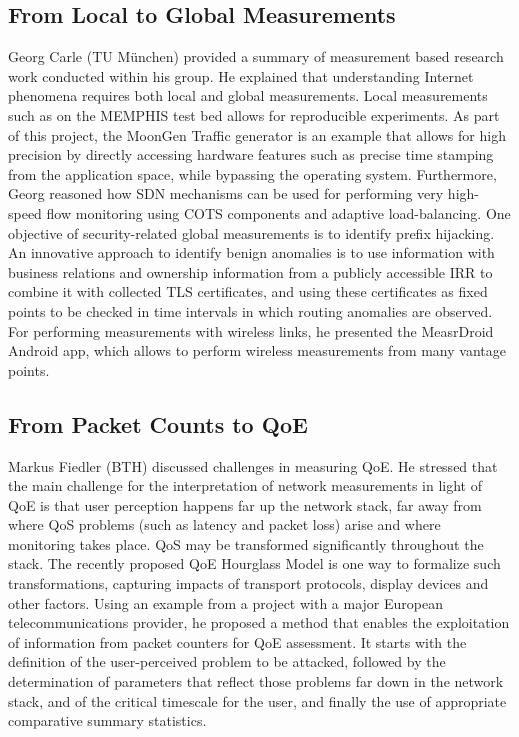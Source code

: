 \subsection{From Local to Global Measurements}

Georg Carle (TU M\"unchen) provided a summary of measurement based research
work conducted within his group. He explained that understanding Internet
phenomena requires both local and global measurements. Local measurements such
as on the MEMPHIS test bed allows for reproducible experiments. As part of
this project, the MoonGen Traffic generator \cite{gcarle:imc:2015} is an
example that allows for high precision by directly accessing hardware features
such as precise time stamping from the application space, while bypassing the
operating system.  Furthermore, Georg reasoned how \ac{SDN} mechanisms can be
used for performing very high-speed flow monitoring using \ac{COTS} components
and adaptive load-balancing. One objective of security-related global
measurements is to identify prefix hijacking. An innovative approach
\cite{gcarle:tma:2015} to identify benign anomalies is to use information with
business relations and ownership information from a publicly accessible
\ac{IRR} to combine it with collected TLS certificates, and using these
certificates as fixed points to be checked in time intervals in which routing
anomalies are observed. For performing measurements with wireless links, he
presented the MeasrDroid Android app, which allows to perform wireless
measurements from many vantage points.

\subsection{From Packet Counts to QoE}

Markus Fiedler (BTH) discussed challenges in measuring \ac{QoE}. He stressed
that the main challenge for the interpretation of network measurements in
light of \ac{QoE} is that user perception happens far up the network stack,
far away from where \ac{QoS} problems (such as latency and packet loss) arise
and where monitoring takes place.  \ac{QoS} may be transformed significantly
throughout the stack. The recently proposed \ac{QoE} Hourglass Model
\cite{mfiedler:commantel:2013} is one way to formalize such transformations,
capturing impacts of transport protocols, display devices and other factors.
Using an example from a project with a major European telecommunications
provider, he proposed a method that enables the exploitation of information
from packet counters for \ac{QoE} assessment.  It starts with the definition
of the user-perceived problem to be attacked, followed by the determination of
parameters that reflect those problems far down in the network stack, and of
the critical timescale for the user, and finally the use of appropriate
comparative summary statistics.

